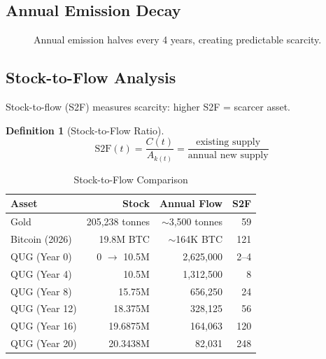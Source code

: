 \documentclass[11pt,a4paper]{article}
\newtheorem{definition}[theorem]{Definition}
\begin{document}
\subsection{Annual Emission Decay}

\begin{figure}[H]
\centering
{}
\caption{Annual emission halves every 4 years, creating predictable scarcity.}
\end{figure}

\subsection{Stock-to-Flow Analysis}

Stock-to-flow (S2F) measures scarcity: higher S2F = scarcer asset.

\begin{definition}[Stock-to-Flow Ratio]
\begin{equation}
    \text{S2F}(t) = \frac{C(t)}{A_{k(t)}} = \frac{\text{existing supply}}{\text{annual new supply}}
\end{equation}
\end{definition}

\begin{table}[H]
\centering
\caption{Stock-to-Flow Comparison}
\label{tab:s2f}
\begin{tabular}{@{}lrrr@{}}
\toprule
\textbf{Asset} & \textbf{Stock} & \textbf{Annual Flow} & \textbf{S2F} \\
\midrule
Gold & 205,238 tonnes & $\sim$3,500 tonnes & 59 \\
Bitcoin (2026) & 19.8M BTC & $\sim$164K BTC & 121 \\
QUG (Year 0) & 0 $\to$ 10.5M & 2,625,000 & 2--4 \\
QUG (Year 4) & 10.5M & 1,312,500 & 8 \\
QUG (Year 8) & 15.75M & 656,250 & 24 \\
QUG (Year 12) & 18.375M & 328,125 & 56 \\
QUG (Year 16) & 19.6875M & 164,063 & 120 \\
QUG (Year 20) & 20.3438M & 82,031 & 248 \\
\bottomrule
\end{tabular}
\end{table}
\end{document}
